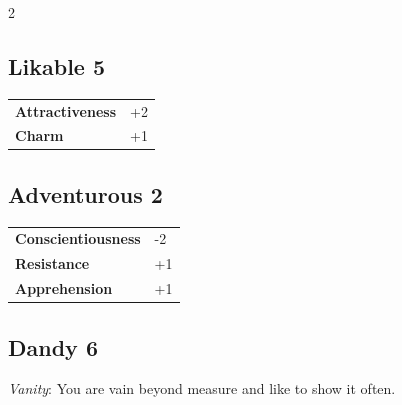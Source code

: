 \begin{multicols}{2}
\begin{tcolorbox}

\end{tcolorbox}

\begin{tcolorbox}
    \subsection*{Likable \hfill \small{5 }}
    \tcblower




\begin{tabular}{@{}ll@{}}
    \textbf{Attractiveness} & +2\\
    \textbf{Charm} & +1\\
\end{tabular}


\end{tcolorbox}

\begin{tcolorbox}
    \subsection*{Adventurous \hfill \small{2 }}
    \tcblower




\begin{tabular}{@{}ll@{}}
    \textbf{Conscientiousness} & -2\\
    \textbf{Resistance} & +1\\
    \textbf{Apprehension} & +1\\
\end{tabular}


\end{tcolorbox}

\begin{tcolorbox}
    \subsection*{Dandy \hfill \small{6 }}
    \tcblower
\textit{Vanity}: You are vain beyond measure and like to show it often.



\end{tcolorbox}
\end{multicols}
